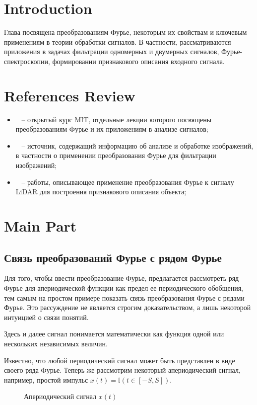 \section{Introduction}

Глава посвящена преобразованиям Фурье, некоторым их свойствам и ключевым применениям в теории обработки сигналов. В частности, рассматриваются приложения в задачах фильтрации одномерных и двумерных сигналов, Фурье-спектроскопии, формировании признакового описания входного сигнала.

\section{References Review}

\begin{itemize}
    \item ~\cite{MITcourse} -- открытый курс MIT, отдельные лекции которого посвящены преобразованиям Фурье и их приложениям в анализе сигналов;
    \item ~\cite{GonzalezWoods} -- источник, содержащий информацию об анализе и обработке изображений, в частности о применении преобразования Фурье для фильтрации изображений;
    \item ~\cite{LiDAR1, LiDAR2} -- работы, описывающее применение преобразования Фурье к сигналу LiDAR для построения признакового описания объекта;
\end{itemize}

\section{Main Part}

\subsection{Связь преобразований Фурье с рядом Фурье}

Для того, чтобы ввести преобразование Фурье, предлагается рассмотреть ряд Фурье для апериодической функции как предел ее периодического обобщения, тем самым на простом примере показать связь преобразования Фурье с рядами Фурье. Это рассуждение не является строгим доказательством, а лишь некоторой интуицией о связи понятий.

Здесь и далее сигнал понимается математически как функция одной или нескольких независимых величин.

Известно, что любой периодический сигнал может быть представлен в виде своего ряда Фурье. 
Теперь же рассмотрим некоторый апериодический сигнал, например, простой импульс $x(t) = \mathbb{I}(t \in [-S, S])$. 
\begin{figure}[!htb]
\caption{Апериодический сигнал $x(t)$}
\end{figure}

